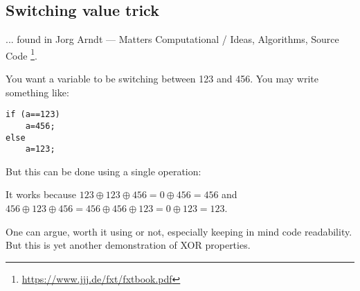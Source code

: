\subsection{Switching value trick}

... found in Jorg Arndt --- Matters Computational / Ideas, Algorithms, Source Code
\footnote{\url{https://www.jjj.de/fxt/fxtbook.pdf}}.

You want a variable to be switching between 123 and 456.
You may write something like:

\begin{lstlisting}
if (a==123)
    a=456;
else
    a=123;
\end{lstlisting}

But this can be done using a single operation:



It works because $123 \oplus 123 \oplus 456=0 \oplus 456=456$ and
$456 \oplus 123 \oplus 456=456 \oplus 456 \oplus 123=0 \oplus 123=123$.

One can argue, worth it using or not, especially keeping in mind code readability.
But this is yet another demonstration of XOR properties.

